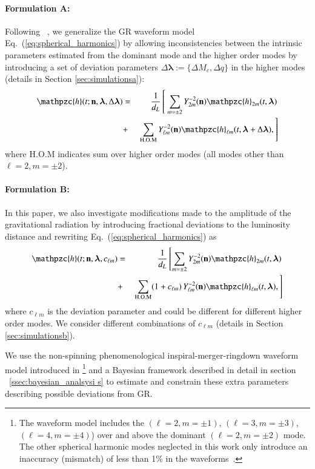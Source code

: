 \documentclass[prd,preprintnumbers,twocolumn,eqsecnum,floatfix,a4paper,nofootinbib,superscriptaddress]{revtex4}
\newcommand{\h}{\mathpzc{h}}
\newcommand{\hlm}{\mathpzc{h}_{\ell m}}
\newcommand{\Ylm}{{Y}^{-2}_{\ell m}}
\newcommand{\blambda}{\bm{\lambda}}
\newcommand{\n}{\mathbf{n}}
\begin{document}
\paragraph{Formulation A:}
	Following ~\cite{dhanpal2018}, we generalize the GR waveform model Eq.~(\ref{eq:spherical_harmonics}) by allowing inconsistencies between the intrinsic parameters estimated from the dominant mode and the higher order modes by introducing a set of deviation parameters $\Delta \blambda := \{\Delta M_c, \Delta q\}$ in the higher modes (details in Section \ref{sec:simulationsa}):
	\begin{eqnarray}
	\h(t; \n, \blambda, \Delta \blambda) & = &  \frac{1}{d_L} \left[ ~ \sum_{m = \pm2} Y^{-2}_{2m} (\n) {\h}_{2m}(t, \blambda) \right. \nonumber \\ 
	& + & \left. \sum _{\text{H.O.M}} \Ylm (\n) \hlm(t, \blambda+\Delta \blambda), \right]
	\label{eq:test_1}
	\end{eqnarray}
where {H.O.M} indicates sum over higher order modes (all modes other than $\ell = 2, m = \pm 2$). 

\paragraph{Formulation B:}
In this paper, we also investigate modifications made to the amplitude of the gravitational radiation by introducing fractional deviations to the luminosity distance and rewriting Eq.~(\ref{eq:spherical_harmonics}) as
	\begin{eqnarray}
	{\h}(t; \n, \blambda, c_{\ell m}) & = & \frac{1}{d_L} \left[ \sum_{m = \pm2} Y^{-2}_{2m} (\n) {\h}_{2m}(t, \blambda)  \right. \nonumber \\ 
	& + & \left. \sum _{\text{H.O.M}} (1+{c_{\ell m}}) \, \Ylm (\n) \hlm(t, \blambda), \right] 
	\label{eq:test_2}
	\end{eqnarray}
	where $c_{\ell m}$ is the deviation parameter and could be different for different higher order modes. We consider different combinations of ${c_{\ell m}}$ (details in Section \ref{sec:simulationsb}). 

We use the non-spinning phenomenological inspiral-merger-ringdown waveform model introduced in \cite{Mehta:2017jpq}\footnote{The waveform model includes the $(\ell = 2, m=\pm1)$, $(\ell = 3, m=\pm3)$, $(\ell = 4, m = \pm4)$) over and above the dominant $(\ell = 2, m = \pm2)$ mode. The other spherical harmonic modes neglected in this work only introduce an inaccuracy (mismatch) of less than 1\% in the waveforms~\cite{Mehta:2017jpq}.} and a Bayesian framework described in detail in section ~\ref{ssec:bayesian_analsysi	s} to estimate and constrain these extra parameters describing possible deviations from GR.
\end{document}
